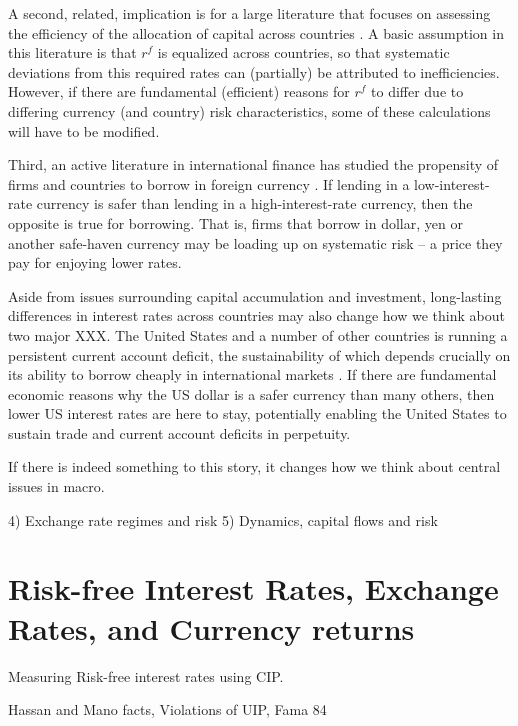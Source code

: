 \documentclass[12pt,letter]{article}
\theoremstyle{break} \theorembodyfont{\normalfont\itshape}
\theoremstyle{break}
\theoremstyle{break} \theorembodyfont{\normalfont\itshape}
\theoremstyle{break} \theorembodyfont{\normalfont\itshape}
\begin{document}
A second, related, implication is for a large literature that focuses on assessing the efficiency of the allocation of capital across countries \citep{HallJones1997, CaselliFeyrer2007}. A basic assumption in this literature is that $r^f$ is equalized across countries, so that systematic deviations from this required rates can (partially) be attributed to inefficiencies. However, if there are fundamental (efficient) reasons for $r^f$ to differ due to differing currency (and country) risk characteristics, some of these calculations will have to be modified.

Third, an active literature in international finance has studied the propensity of firms and countries to borrow in foreign currency \citep{DuSchreger2016, KalemliOzcanetal2019}. If lending in a low-interest-rate currency is safer than lending in a high-interest-rate currency, then the opposite is true for borrowing. That is, firms that borrow in dollar, yen or another safe-haven currency may be loading up on systematic risk -- a price they pay for enjoying lower rates.

Aside from issues surrounding capital accumulation and investment, long-lasting differences in interest rates across countries may also change how we think about two major XXX. The United States and a number of other countries is running a persistent current account deficit, the sustainability of which depends crucially on its ability to borrow cheaply in international markets \citep{GourinchasRey2007}. If there are fundamental economic reasons why the US dollar is a safer currency than many others, then lower US interest rates are here to stay, potentially enabling the United States to sustain trade and current account deficits in perpetuity.

If there is indeed something to this story, it changes how we think
about central issues in macro.

 4) Exchange rate regimes and risk 5)
Dynamics, capital flows and risk


\section{Risk-free Interest Rates, Exchange Rates, and Currency
  returns}

Measuring Risk-free interest rates using CIP.



Hassan and Mano facts, Violations of UIP, Fama 84
\end{document}
